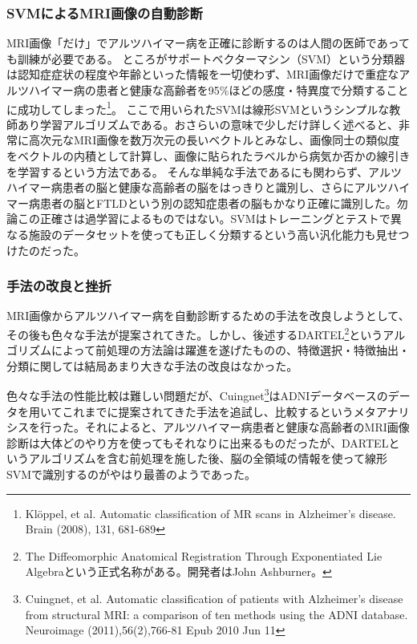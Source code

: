 \subsubsection{SVMによるMRI画像の自動診断}
MRI画像「だけ」でアルツハイマー病を正確に診断するのは人間の医師であっても訓練が必要である。
ところがサポートベクターマシン（SVM）という分類器は認知症症状の程度や年齢といった情報を一切使わず、MRI画像だけで重症なアルツハイマー病の患者と健康な高齢者を95\%ほどの感度・特異度で分類することに成功してしまった\footnote{Kl\"{o}ppel, et al. Automatic classification of MR scans in Alzheimer's disease. Brain (2008), 131, 681-689}。
ここで用いられたSVMは線形SVMというシンプルな教師あり学習アルゴリズムである。おさらいの意味で少しだけ詳しく述べると、非常に高次元なMRI画像を数万次元の長いベクトルとみなし、画像同士の類似度をベクトルの内積として計算し、画像に貼られたラベルから病気か否かの線引きを学習するという方法である。
そんな単純な手法であるにも関わらず、アルツハイマー病患者の脳と健康な高齢者の脳をはっきりと識別し、さらにアルツハイマー病患者の脳とFTLDという別の認知症患者の脳もかなり正確に識別した。勿論この正確さは過学習によるものではない。SVMはトレーニングとテストで異なる施設のデータセットを使っても正しく分類するという高い汎化能力も見せつけたのだった。

\subsubsection{手法の改良と挫折}
MRI画像からアルツハイマー病を自動診断するための手法を改良しようとして、その後も色々な手法が提案されてきた。しかし、後述するDARTEL\footnote{The Diffeomorphic Anatomical Registration Through Exponentiated Lie Algebraという正式名称がある。開発者はJohn Ashburner。}というアルゴリズムによって前処理の方法論は躍進を遂げたものの、特徴選択・特徴抽出・分類に関しては結局あまり大きな手法の改良はなかった。

色々な手法の性能比較は難しい問題だが、Cuingnet\footnote{Cuingnet, et al. Automatic classification of patients with Alzheimer's disease from structural MRI: a comparison of ten methods using the ADNI database. Neuroimage (2011),56(2),766-81 Epub 2010 Jun 11}はADNIデータベースのデータを用いてこれまでに提案されてきた手法を追試し、比較するというメタアナリシスを行った。それによると、アルツハイマー病患者と健康な高齢者のMRI画像診断は大体どのやり方を使ってもそれなりに出来るものだったが、DARTELというアルゴリズムを含む前処理を施した後、脳の全領域の情報を使って線形SVMで識別するのがやはり最善のようであった。


